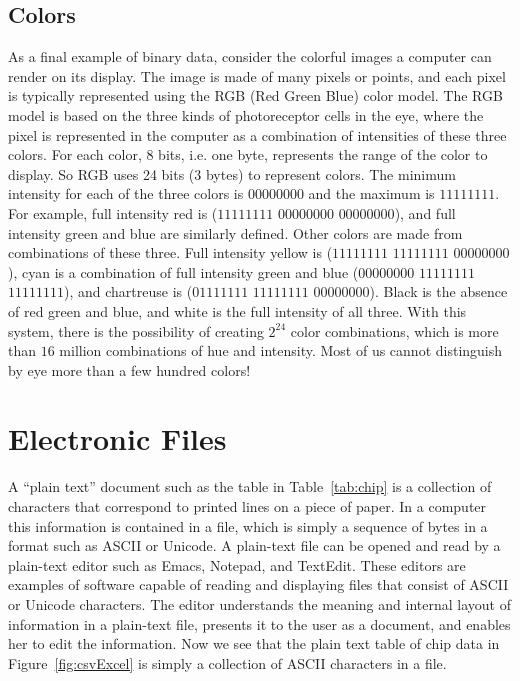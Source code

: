 \subsection{Colors}
As a final example of binary data, consider the colorful images a
computer can render on its display.  The image is made of many pixels
or points, and each pixel is typically represented using the RGB (Red
Green Blue) color model.  The RGB model is based on the three kinds of
photoreceptor cells in the eye, where the pixel is represented in the
computer as a combination of intensities of these three colors. For
each color, 8 bits, i.e. one byte, represents the range of the color
to display. So RGB uses 24 bits (3 bytes) to represent colors.  The
minimum intensity for each of the three colors is $00000000$ and the
maximum is $11111111$.  For example, full intensity red is ($11111111$
$00000000$ $00000000$), and full intensity green and blue are
similarly defined. Other colors are made from combinations of these
three.  Full intensity yellow is ($11111111$ $11111111$ $00000000$),
cyan is a combination of full intensity green and blue ($00000000$
$11111111$ $11111111$), and chartreuse is ($01111111$ $11111111$
$00000000$). Black is the absence of red green and blue, and white is
the full intensity of all three.  With this system, there is the
possibility of creating $2^{24}$ color combinations, which is more
than $16$ million combinations of hue and intensity.  Most of us
cannot distinguish by eye more than a few hundred colors!


\section{Electronic Files}\label{sec:electronicFiles}
A ``plain text'' document such as the table in Table~\ref{tab:chip} is
a collection of characters that correspond to printed lines on a
piece of paper.  In a computer this information is contained in a
file, which is simply a sequence of bytes in a format such as ASCII or
Unicode.  A plain-text file can be opened and read by a plain-text
editor such as Emacs, Notepad, and TextEdit.  These editors are
examples of software capable of reading and displaying files that
consist of ASCII or Unicode characters. The editor understands the
meaning and internal layout of information in a plain-text file,
presents it to the user as a document, and enables her to edit the
information.  Now we see that the plain text table of chip data in
Figure~\ref{fig:csvExcel} is simply a collection of ASCII characters
in a file.

